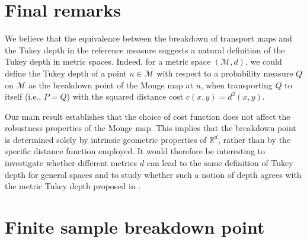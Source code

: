 \documentclass[11pt]{article}
\theoremstyle{plain}
\theoremstyle{definition}\newtheorem{definition}[theorem]{Definition}
\theoremstyle{remark}
\begin{document}
\section{Final remarks}


%
%
%

%





%

%
%
We believe that the equivalence between the breakdown of transport maps and the Tukey depth in the reference measure suggests a natural definition of the Tukey depth in metric spaces. Indeed, for a metric space $(\mathcal{M}, d)$,  we  could define the Tukey depth of a point $u \in \mathcal{M}$ with respect to a probability measure $Q$ on $\mathcal{M}$ as the breakdown point of the Monge map at $u$, when transporting $Q$ to itself (i.e., $P = Q$) with the squared distance cost $c(x,y) = d^2(x,y)$. 


Our main result
 establishes that the choice of cost function does not affect the robustness properties of the Monge map. This implies that the breakdown point is determined solely by intrinsic geometric properties of $\mathbb{R}^d$, rather than by the specific distance function employed. %
It would therefore be interesting to investigate whether different metrics $d$ can lead to the same definition of Tukey depth for general spaces and to study whether such a notion of depth  agrees with the metric Tukey depth proposed in \cite{LopezTukeyMetric}.  



\appendix


\section{Finite sample breakdown point}
\label{app:proof_finite_sample_BP}
%
\end{document}
